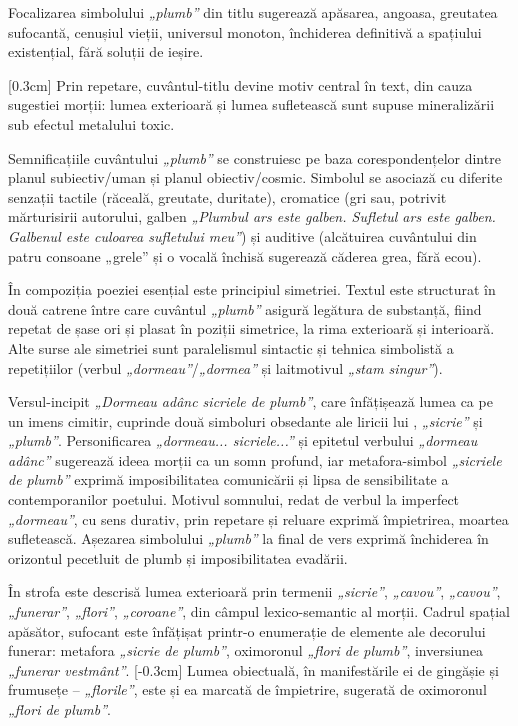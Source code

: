 Focalizarea simbolului \textit{„plumb”} din titlu sugerează apăsarea, angoasa, greutatea sufocantă, cenușiul vieții, universul monoton, închiderea definitivă a spațiului existențial, fără soluții de ieșire.

[0.3cm]
Prin repetare, cuvântul-titlu devine motiv central în text, din cauza sugestiei morții: lumea exterioară și lumea sufletească sunt supuse mineralizării sub efectul metalului toxic.

Semnificațiile cuvântului \textit{„plumb”} se construiesc pe baza corespondențelor dintre planul subiectiv/uman și planul obiectiv/cosmic. Simbolul se asociază cu diferite senzații tactile (răceală, greutate, duritate), cromatice (gri sau, potrivit mărturisirii autorului, galben \textit{„Plumbul ars este galben. Sufletul ars este galben. Galbenul este culoarea sufletului meu”}) și auditive (alcătuirea cuvântului din patru consoane „grele” și o vocală închisă sugerează căderea grea, fără ecou).

În compoziția poeziei esențial este principiul simetriei. Textul este structurat în două catrene între care cuvântul \textit{„plumb”} asigură legătura de substanță, fiind repetat de șase ori și plasat în poziții simetrice, la rima exterioară și interioară. Alte surse ale simetriei sunt paralelismul sintactic și tehnica simbolistă a repetițiilor (verbul \textit{„dormeau”}/\textit{„dormea”} și laitmotivul \textit{„stam singur”}).

Versul-incipit \textit{„Dormeau adânc sicriele de plumb”}, care înfățișează lumea ca pe un imens cimitir, cuprinde două simboluri obsedante ale liricii lui \operaauthor, \textit{„sicrie”} și \textit{„plumb”}. Personificarea \textit{„dormeau... sicriele...”} și epitetul verbului \textit{„dormeau adânc”} sugerează ideea morții ca un somn profund, iar metafora-simbol \textit{„sicriele de plumb”} exprimă imposibilitatea comunicării și lipsa de sensibilitate a contemporanilor poetului. Motivul somnului, redat de verbul la imperfect \textit{„dormeau”}, cu sens durativ, prin repetare și reluare exprimă împietrirea, moartea sufletească. Așezarea simbolului \textit{„plumb”} la final de vers exprimă închiderea în orizontul pecetluit de plumb și imposibilitatea evadării.

În strofa  este descrisă lumea exterioară prin termenii \textit{„sicrie”}, \textit{„cavou”}, \textit{„cavou”}, \textit{„funerar”}, \textit{„flori”}, \textit{„coroane”}, din câmpul lexico-semantic al morții. Cadrul spațial apăsător, sufocant este înfățișat printr-o enumerație de elemente ale decorului funerar: metafora \textit{„sicrie de plumb”}, oximoronul \textit{„flori de plumb”}, inversiunea \textit{„funerar vestmânt”}.
[-0.3cm]
Lumea obiectuală, în manifestările ei de gingășie și frumusețe -- \textit{„florile”}, este și ea marcată de împietrire, sugerată de oximoronul \textit{„flori de plumb”}.

